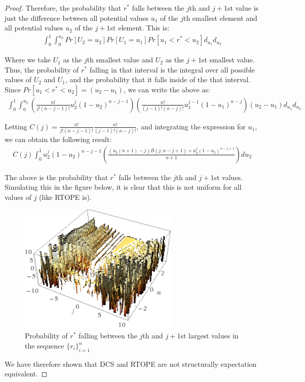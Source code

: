\documentclass[12pt]{article}
\begin{document}
\begin{proof}
Therefore, the probability that $r^*$ falls between the $j$th and $j+1$st value is just the difference between all potential values $u_1$ of the $j$th smallest element and all potential values $u_2$ of the $j+1$st element. This is:
    \begin{eqnarray}
      \int_{0}^1 \int_0^{u_2} Pr[U_2 = u_2] Pr[U_1 = u_1] Pr[u_1 < r^* < u_2] d_{u_1} d_{u_2}
    \end{eqnarray}

Where we take $U_1$ as the $j$th smallest value and $U_2$ as the $j+1$st smallest value. Thus, the probability of $r^*$ falling in that interval is the integral over all possible values of $U_2$ and $U_1$, and the probability that it falls inside of the that interval. Since $Pr[u_1 < r^* < u_2] = (u_2 - u_1)$, we can write the above as:
\begin{eqnarray}
      \int_{0}^1 \int_0^{u_2} \left( \frac{n!}{j!(n-j-1)!} u_2^j (1 - u_2)^{n-j-1} \right) \left( \frac{n!}{(j-1)!(n-j)!} u_1^{j-1} (1 - u_1)^{n-j} \right) (u_2 - u_1) d_{u_1} d_{u_2}
    \end{eqnarray}

Letting $C(j) = \frac{n!}{j!(n-j-1)!} \frac{n!}{(j-1)!(n-j)!}$, and integrating the expression for $u_1$, we can obtain the following result:
    \begin{eqnarray}
      C(j) \int_0^1 u_2^j (1 - u_2)^{n-j-1} \left( \frac{(u_2 (n+1) - j) B(j, n-j+1) + u_2^j (1-u_2)^{n-j+1}}{n+1} \right) d u_2
    \end{eqnarray}

The above is the probability that $r^*$ falls between the $j$th and $j+1$st values. Simulating this in the figure below, it is clear that this is not uniform for all values of $j$ (like RTOPE is).
    \begin{figure}[H]
      \centering
      \includegraphics[width=3in]{ball_result.png}
      \caption{Probability of $r^*$ falling between the $j$th and $j+1$st largest values in the sequence $\{r_i\}_{i=1}^n$}
    \end{figure}

  We have therefore shown that DCS and RTOPE are not structurally expectation equivalent.
\end{proof}
\end{document}
